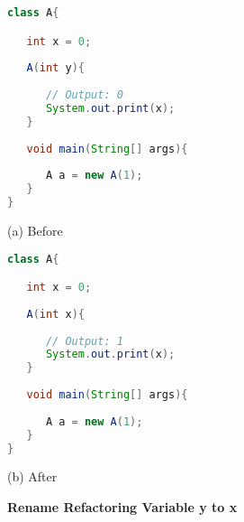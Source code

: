 \begin{figure}[th]
\centering
\begin{minipage}[t]{0.47\linewidth}
\begin{lstlisting}[language=java, basicstyle=\scriptsize\ttfamily,frame=single]
class A{

   int x = 0;
	
   A(int y){
	   
      // Output: 0
      System.out.print(x);
   }
	
   void main(String[] args){
	
      A a = new A(1);
   }
}
\end{lstlisting}
\centering(a) Before 
\end{minipage}
\hfill
\begin{minipage}[t]{0.47\linewidth}
\begin{lstlisting}[language=java, basicstyle=\scriptsize\ttfamily,frame=single]
class A{

   int x = 0;
	
   A(int x){
	   
      // Output: 1
      System.out.print(x);
   }
	
   void main(String[] args){
	
      A a = new A(1);
   }
}
\end{lstlisting}
\centering(b) After 
\end{minipage}
\caption{\textbf{Rename Refactoring Variable y to x }}
\label{figure:precond5_3}
\end{figure}



